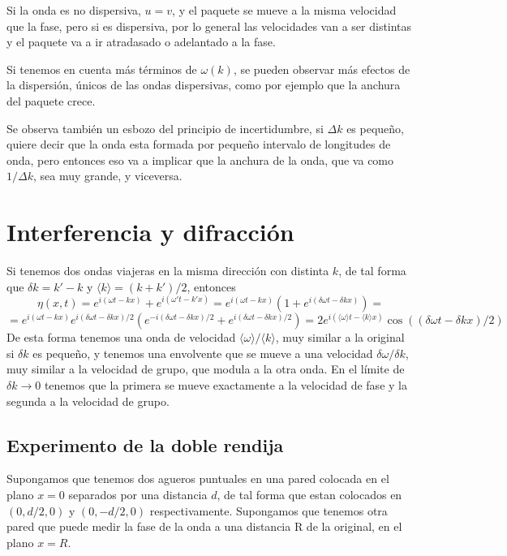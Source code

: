 Si la onda es no dispersiva, $u = v$, y el paquete se mueve a la misma velocidad que la fase, pero si es dispersiva, por lo general las velocidades van a ser distintas y el paquete va a ir atradasado o adelantado a la fase.

Si tenemos en cuenta más términos de $\omega(k)$, se pueden observar más efectos de la dispersión, únicos de las ondas dispersivas, como por ejemplo que la anchura del paquete crece.

Se observa también un esbozo del principio de incertidumbre, si $\Delta k$ es pequeño, quiere decir que la onda esta formada por pequeño intervalo de longitudes de onda, pero entonces eso va a implicar que la anchura de la onda, que va como $1/\Delta k$, sea muy grande, y viceversa.

\section{Interferencia y difracción}
Si tenemos dos ondas viajeras en la misma dirección con distinta $k$, de tal forma que $\delta k = k'-k$ y $\langle k\rangle=(k+k')/2$, entonces
\[\eta(x,t) = e^{i(\omega t - kx)}+e^{i(\omega't-k'x)} = e^{i(\omega t - kx)}\left(1+e^{i(\delta \omega t - \delta k x)}\right)= \]
\begin{equation} \label{6.1.1}
    = e^{i(\omega t - kx)}e^{i(\delta \omega t - \delta k x)/2}\left(e^{-i(\delta \omega t - \delta k x)/2}+e^{i(\delta \omega t - \delta k x)/2}\right) = 2 e^{i(\langle \omega \rangle t - \langle k\rangle x)} \cos((\delta \omega t - \delta k x)/2)
\end{equation}
De esta forma tenemos una onda de velocidad $\langle \omega \rangle/\langle k\rangle$, muy similar a la original si $\delta k$ es pequeño, y tenemos una envolvente que se mueve a una velocidad $\delta \omega/\delta k$, muy similar a la velocidad de grupo, que modula a la otra onda. En el límite de $\delta k \rightarrow 0$ tenemos que la primera se mueve exactamente a la velocidad de fase y la segunda a la velocidad de grupo.
\subsection{Experimento de la doble rendija}
Supongamos que tenemos dos agueros puntuales en una pared colocada en el plano $x=0$ separados por una distancia $d$, de tal forma que estan colocados en $(0,d/2,0)$ y $(0,-d/2,0)$ respectivamente. Supongamos que tenemos otra pared que puede medir la fase de la onda a una distancia R de la original, en el plano $x=R$.

